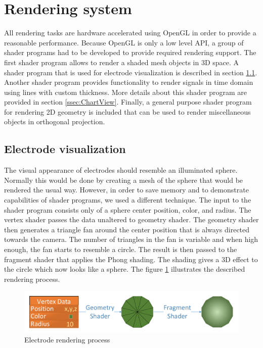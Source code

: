 \section{Rendering system}
\label{sec:implRendering}
All rendering tasks are hardware accelerated using OpenGL in order to provide a reasonable performance. Because OpenGL is only a low level API, a group of shader programs had to be developed to provide required rendering support. The first shader program allows to render a shaded mesh objects in 3D space. A shader program that is used for electrode visualization is described in section \ref{ssec:implElVis}. Another shader program provides functionality to render signals in time domain using lines with custom thickness. More details about this shader program are provided in section \ref{ssec:ChartView}. Finally, a general purpose shader program for rendering 2D geometry is included that can be used to render miscellaneous objects in orthogonal projection.  

\subsection{Electrode visualization}
\label{ssec:implElVis}
The visual appearance of electrodes should resemble an illuminated sphere. Normally this would be done by creating a mesh of the sphere that would be rendered the usual way. However, in order to save memory and to demonstrate capabilities of shader programs, we used a different technique. The input to the shader program consists only of a sphere center position, color, and radius. The vertex shader passes the data unaltered to geometry shader. The geometry shader then generates a triangle fan around the center position that is always directed towards the camera. The number of triangles in the fan is variable and when high enough, the fan starts to resemble a circle. The result is then passed to the fragment shader that applies the Phong shading. The shading gives a 3D effect to the circle which now looks like a sphere. The figure \ref{fig:ElRender} illustrates the described rendering process.

\begin{figure}[ht]
	\centering
	\includegraphics[width=1\linewidth]{fig/ElRender.pdf}
	\caption{Electrode rendering process}
	\label{fig:ElRender}
\end{figure}

